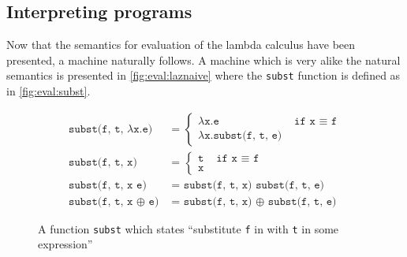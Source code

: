 \subsection{Interpreting programs}
Now that the semantics for evaluation of the lambda calculus have been presented, a machine naturally follows.
A machine which is very alike the natural semantics is presented in \autoref{fig:eval:laznaive} where the \texttt{subst} function is defined as in \autoref{fig:eval:subst}.
\begin{figure}[p]
\begin{mdframed}
\begin{align}
  \texttt{subst(f, t, $\lambda$x.e) }&\texttt{= } 
  \begin{cases}
    \texttt{$\lambda$x.e }& \texttt{if x $\equiv$ f}\\
    \texttt{$\lambda$x.subst(f, t, e) }&
  \end{cases}\tag*{}\\
  \texttt{subst(f, t, x) }&\texttt{= }
  \begin{cases}
    \texttt{t }& \texttt{if x $\equiv$ f}\\
    \texttt{x }&
  \end{cases}\tag*{}\\
  \texttt{subst(f, t, x e) }&\texttt{= subst(f, t, x) subst(f, t, e)}\tag*{}\\
  \texttt{subst(f, t, x $\oplus$ e) }&\texttt{= subst(f, t, x) $\oplus$ subst(f, t, e)}\tag*{}
\end{align}
\end{mdframed}
  \caption{A function \texttt{subst} which states ``substitute \texttt{f} in with \texttt{t} in some expression''}
  \label{fig:eval:subst}
\end{figure}
